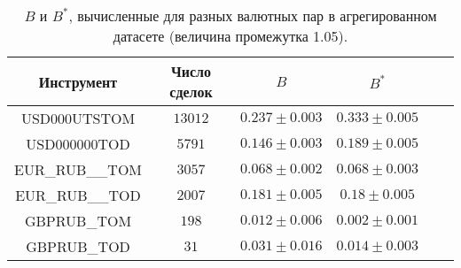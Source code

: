 \begin{table}[h!]
    \begin{center}
        \begin{tabular}{|c|c|c|c|c|c|}
            \hline
            Инструмент      & Число сделок & $B$               & $B ^*$            \\ \hline
            USD000UTSTOM    & $13012$ & $0.237 \pm 0.003$ & $0.333 \pm 0.005$ \\ \hline
            USD000000TOD    & $5791$  & $0.146 \pm 0.003$ & $0.189 \pm 0.005$ \\ \hline
            EUR\_RUB\_\_TOM & $3057$  & $0.068 \pm 0.002$ & $0.068 \pm 0.003$ \\ \hline
            EUR\_RUB\_\_TOD & $2007$  & $0.181 \pm 0.005$ & $0.18 \pm 0.005$  \\ \hline
            GBPRUB\_TOM     & $198$   & $0.012 \pm 0.006$ & $0.002 \pm 0.001$ \\ \hline
            GBPRUB\_TOD     & $31$    & $0.031 \pm 0.016$ & $0.014 \pm 0.003$ \\ \hline
        \end{tabular}
    \end{center}
    \caption{$B$ и $B ^*$, вычисленные для разных валютных пар в агрегированном датасете (величина промежутка 1.05).}
    \label{Aggreg1CU}
\end{table}

